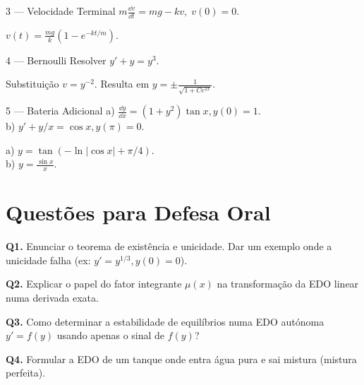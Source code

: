 \begin{exercisebox}{3 --- Velocidade Terminal}
  $m\frac{\dd v}{\dd t} = mg - kv, \; v(0)=0$.
\end{exercisebox}
\begin{solbox}
  $v(t) = \frac{mg}{k}(1-e^{-kt/m})$.
\end{solbox}

\begin{exercisebox}{4 --- Bernoulli}
  Resolver $y' + y = y^3$.
\end{exercisebox}
\begin{solbox}
  Substituição $v = y^{-2}$. Resulta em $\boxed{y = \pm\frac{1}{\sqrt{1+Ce^{2x}}}.}$
\end{solbox}

\begin{exercisebox}{5 --- Bateria Adicional}
  a) $\frac{\dd y}{\dd x} = (1+y^2)\tan x, y(0)=1$. \\
  b) $y' + y/x = \cos x, y(\pi)=0$.
\end{exercisebox}
\begin{solbox}
  a) $y = \tan(-\ln|\cos x| + \pi/4)$. \\
  b) $y = \frac{\sin x}{x}$.
\end{solbox}

\section{Questões para Defesa Oral}

\begin{oralbox}
  \textbf{Q1.} Enunciar o teorema de existência e unicidade. Dar um exemplo onde a unicidade falha (ex: $y' = y^{1/3}, y(0)=0$).
\end{oralbox}

\begin{oralbox}
  \textbf{Q2.} Explicar o papel do fator integrante $\mu(x)$ na transformação da EDO linear numa derivada exata.
\end{oralbox}

\begin{oralbox}
  \textbf{Q3.} Como determinar a estabilidade de equilíbrios numa EDO autónoma $y' = f(y)$ usando apenas o sinal de $f(y)$?
\end{oralbox}

\begin{oralbox}
  \textbf{Q4.} Formular a EDO de um tanque onde entra água pura e sai mistura (mistura perfeita).
\end{oralbox}